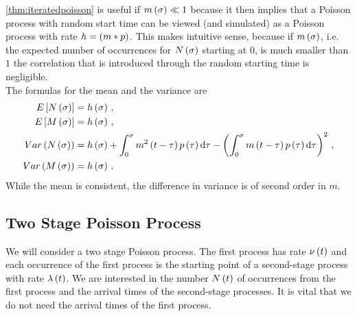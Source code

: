 \documentclass{amsart}
\numberwithin{equation}{section}
\begin{document}
\begin{remark}
\autoref{thm:iteratedpoisson} is useful if $m\left(\sigma\right) \ll 1$ because it then implies that a Poisson process with random start time can be viewed (and simulated) as a Poisson process with rate $h = \left(m \ast p\right)$. This makes intuitive sense, because if $m\left(\sigma\right)$, i.e. the expected number of occurrences for $N\left(\sigma\right)$ starting at $0$, is much smaller than $1$ the correlation that is introduced through the random starting time is negligible.\\

\noindent The formulas for the mean and the variance are
\begin{align*}
E\left[N\left(\sigma\right)\right] &= h\left(\sigma\right) \, ,\\
E\left[M\left(\sigma\right)\right] &= h\left(\sigma\right) \, ,\\
Var\left(N\left(\sigma\right)\right) &= h\left(\sigma\right) + \int_0^\sigma m^2\left(t-\tau\right) p\left(\tau\right) \mathrm{d}\tau - \left(\int_0^\sigma m\left(t-\tau\right) p\left(\tau\right) \mathrm{d}\tau\right)^2 \, , \\
Var\left(M\left(\sigma\right)\right) &= h\left(\sigma\right) \, .
\end{align*}
While the mean is consistent, the difference in variance is of second order in $m$.
\end{remark}



\subsection{Two Stage Poisson Process}
We will consider a two stage Poisson process. The first process has rate $\nu\left(t\right)$ and each occurrence of the first process is the starting point of a second-stage process with rate $\lambda\left(t\right)$. We are interested in the number $N\left(t\right)$ of occurrences from the first process and the arrival times of the second-stage processes. It is vital that we do not need the arrival times of the first process.
\end{document}
